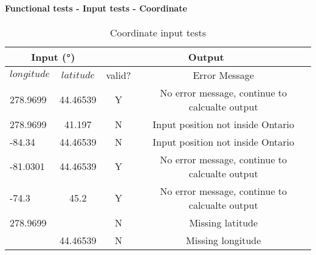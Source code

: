 \documentclass[12pt, titlepage]{article}
\begin{document}
		
\paragraph{Functional tests - Input tests - Coordinate}

\begin{center}
\begin{table}[h]
\resizebox{\textwidth}{!}
{ %
    \begin{tabular}{ lc|cc }
    \hline
      \multicolumn{2}{c|}{Input (\si[per-mode=symbol] {\degree}) }                            & \multicolumn{2}{c}{Output} \\ 
    
    \hline
        $longitude$   &   $latitude$     &   valid?   &   Error Message \\ \hline
    
       278.9699  & 44.46539 &  Y  & No error message, continue to calcualte output                         \\  \hline
       278.9699  & 41.197 &  N  & Input position not inside Ontario                         \\  \hline
       -84.34  & 44.46539 &  N  & Input position not inside Ontario                         \\  \hline
       -81.0301  & 44.46539 &  Y  & No error message, continue to calcualte output                          \\  \hline
       -74.3  & 45.2 &  Y  &  No error message, continue to calcualte output                       \\   \hline
       278.9699  &  &  N  & Missing latitude                         \\   \hline
      &  44.46539 &  N  & Missing longitude                       \\

    
    \hline
    
    
    \end{tabular} %
}
\caption{Coordinate input tests}
\label{Table:coordinate_test}
\end{table}
\end{center}
\end{document}
